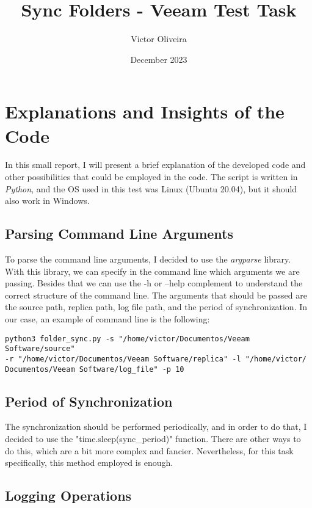 \documentclass{article}
\title{\textbf{Sync Folders - Veeam Test Task}}
\author{Victor Oliveira}
\date{December 2023}
\begin{document}
\maketitle

\section{Explanations and Insights of the Code}

In this small report, I will present a brief explanation of the developed code and other possibilities that could be employed in the code. 
The script is written in \textit{Python}, and the OS used in this test was Linux (Ubuntu 20.04), but it should also work in Windows. 

\subsection{Parsing Command Line Arguments}

% 

To parse the command line arguments, I decided to use the \textit{argparse} library. With this library, we can specify in the command line which arguments we are passing. Besides that we can use the -h or --help complement to understand the correct structure of the command line. The arguments that should be passed are the source path, replica path, log file path, and the period of synchronization.
In our case, an example of command line is the following:

\begin{lstlisting}
python3 folder_sync.py -s "/home/victor/Documentos/Veeam Software/source"
-r "/home/victor/Documentos/Veeam Software/replica" -l "/home/victor/
Documentos/Veeam Software/log_file" -p 10

\end{lstlisting}


\subsection{Period of Synchronization}

The synchronization should be performed periodically, and in order to do that, I decided to use the "time.sleep(sync\_period)" function. There are other ways to do this, which are a bit more complex and fancier. Nevertheless, for this task specifically, this method employed is enough.


\subsection{Logging Operations}
\end{document}
